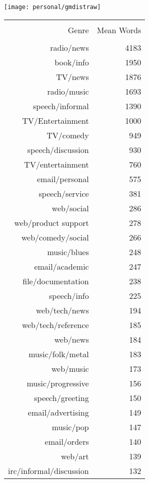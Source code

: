 \begin{table}[ht]
    \centering
    \texttt{[image: personal/gmdistraw]}%

    \begin{tabular}{rr}
        \hline \\
        Genre & Mean Words \\
        \hline \\
        radio/news & 4183 \\ 
        book/info & 1950 \\ 
        TV/news & 1876 \\ 
        radio/music & 1693 \\ 
        speech/informal & 1390 \\ 
        TV/Entertainment & 1000 \\ 
        TV/comedy &  949 \\ 
        speech/discussion &  930 \\ 
        TV/entertainment &  760 \\ 
        email/personal &  575 \\ 
        speech/service &  381 \\ 
        web/social &  286 \\ 
        web/product support &  278 \\ 
        web/comedy/social &  266 \\ 
        music/blues &  248 \\ 
        email/academic &  247 \\ 
        file/documentation &  238 \\ 
        speech/info &  225 \\ 
        web/tech/news &  194 \\ 
        web/tech/reference &  185 \\ 
        web/news &  184 \\ 
        music/folk/metal &  183 \\ 
        web/music &  173 \\ 
        music/progressive &  156 \\ 
        speech/greeting &  150 \\ 
        email/advertising &  149 \\ 
        music/pop &  147 \\ 
        email/orders &  140 \\ 
        web/art &  139 \\ 
        irc/informal/discussion &  132 \\ 

\end{tabular}
\end{table}
